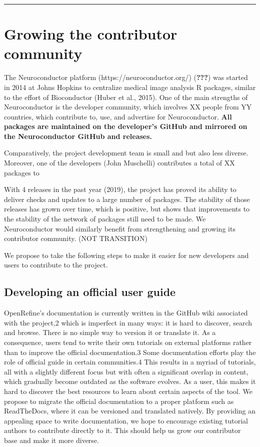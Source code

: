 \documentclass[]{elsarticle} %
\begin{document}
\begin{center}\rule{0.5\linewidth}{0.5pt}\end{center}

\hypertarget{growing-the-contributor-community}{%
\section{Growing the contributor community}\label{growing-the-contributor-community}}

The Neuroconductor platform (https://neuroconductor.org/) ({\textbf{???}}) was started in 2014 at Johns Hopkins to centralize medical image analysis R packages, similar to the effort of Bioconductor (Huber et al., 2015). One of the main strengths of Neuroconductor is the developer community, which involves XX people from YY countries, which contribute to, use, and advertise for Neuroconductor. \textbf{All packages are maintained on the developer's GitHub and mirrored on the Neuroconductor GitHub and releases.}

Comparatively, the project development team is small and but also less
diverse. Moreover, one of the developers (John Muschelli) contributes a total of XX packages to

With 4 releases in the past year (2019), the project has proved its ability to deliver checks and updates to a large number of packages. The stability of those releases has grown over time, which is positive, but shows that improvements to the stability of the network of packages still need to be made. We Neuroconductor would similarly benefit from strengthening and growing its contributor community. (NOT TRANSITION)

We propose to take the following steps to make it easier for new developers and users to contribute to the project.

\hypertarget{developing-an-official-user-guide}{%
\subsection{Developing an official user guide}\label{developing-an-official-user-guide}}

OpenRefine's documentation is currently written in the GitHub wiki associated with the project,2 which is imperfect in many ways: it is hard to
discover, search and browse. There is no simple way to version it or translate it. As a consequence, users tend to write their own tutorials on external
platforms rather than to improve the official documentation.3 Some documentation efforts play the role of official guide in certain communities.4 This
results in a myriad of tutorials, all with a slightly different focus but with often a significant overlap in content, which gradually become outdated as the
software evolves. As a user, this makes it hard to discover the best resources
to learn about certain aspects of the tool.
We propose to migrate the official documentation to a proper platform
such as ReadTheDocs, where it can be versioned and translated natively. By
providing an appealing space to write documentation, we hope to encourage
existing tutorial authors to contribute directly to it. This should help us grow
our contributor base and make it more diverse.
\end{document}
